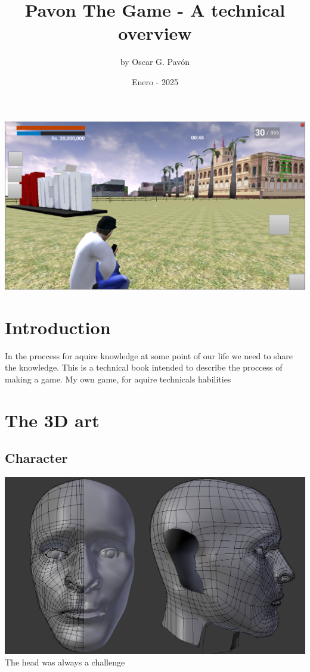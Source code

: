 \documentclass{article}
\title{Pavon The Game - A technical overview}
\date{Enero - 2025}
\author{by Oscar G. Pav\'on}
\begin{document}
  \maketitle
  \includegraphics[width=\textwidth]{1.png}


  \newpage
  \section{Introduction}
  In the proccess for aquire knowledge at some point of our life we need to share the knowledge.
  This is a technical book intended to describe the proccess of making a game. My own game, for aquire technicals habilities

  \newpage
  \section{The 3D art}
  
  \subsection{Character}
  \includegraphics[width=\textwidth]{4.jpg}
  The head was always a challenge
\end{document}
